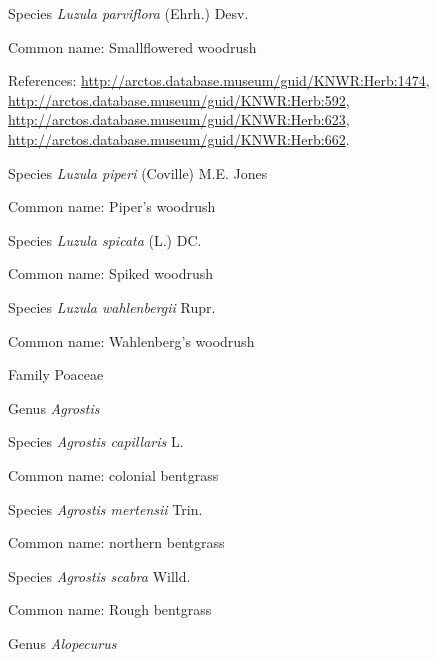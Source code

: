 \documentclass[9pt, article]{memoir}
\begin{document}
\begin{multicols}{2}
\vspace{6pt}\noindent\hspace{36pt}Species \textit{Luzula parviflora} (Ehrh.) Desv.


Common name: Smallflowered woodrush

References: 
\url{http://arctos.database.museum/guid/KNWR:Herb:1474}, 
\url{http://arctos.database.museum/guid/KNWR:Herb:592}, 
\url{http://arctos.database.museum/guid/KNWR:Herb:623}, 
\url{http://arctos.database.museum/guid/KNWR:Herb:662}.

\vspace{6pt}\noindent\hspace{36pt}Species \textit{Luzula piperi} (Coville) M.E. Jones


Common name: Piper's woodrush

\vspace{6pt}\noindent\hspace{36pt}Species \textit{Luzula spicata} (L.) DC.


Common name: Spiked woodrush

\vspace{6pt}\noindent\hspace{36pt}Species \textit{Luzula wahlenbergii} Rupr.


Common name: Wahlenberg's woodrush

\vspace{6pt}\noindent\hspace{24pt}Family Poaceae


\vspace{6pt}\noindent\hspace{30pt}Genus \textit{Agrostis}


\vspace{6pt}\noindent\hspace{36pt}Species \textit{Agrostis capillaris} L.


Common name: colonial bentgrass

\vspace{6pt}\noindent\hspace{36pt}Species \textit{Agrostis mertensii} Trin.


Common name: northern bentgrass

\vspace{6pt}\noindent\hspace{36pt}Species \textit{Agrostis scabra} Willd.


Common name: Rough bentgrass

\vspace{6pt}\noindent\hspace{30pt}Genus \textit{Alopecurus}



\end{multicols}
\end{document}
